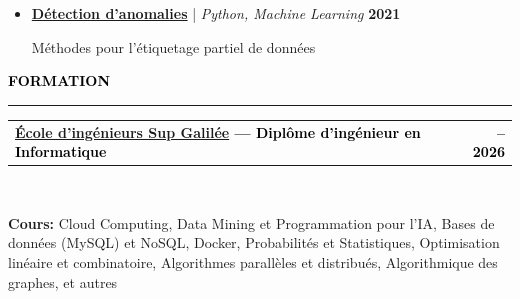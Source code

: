 \documentclass[10pt,english,french]{article}
\makeatletter
\newcommand{\educationIcon}[1][black]{\textcolor{#1}{\faGraduationCap}}
\newlength{\mpwidth}
\newcommand{\cvsection}[1]{
    \vspace{4pt}
    \textbf{\fontsize{9pt}{10pt}\selectfont \textcolor{black}{#1}}
    \vspace{6pt}
    \hrule
    \vspace{6pt}
}
\newcommand{\cvtextnotab}[1]{
    \parbox{1\mpwidth}{#1}
}
\newcommand{\cvevent}[2]{
    \vspace{2pt}
    \parbox{\mpwidth}{
        \begin{tabular*}{1\mpwidth}{@{\extracolsep{\fill}} l r}
            \textcolor{black}{\textbf{\fontsize{11}{12}\selectfont #1}} & \textcolor{black}{\textbf{\fontsize{12}{12}\selectfont #2}} \\
        \end{tabular*}\\[-8pt] %
    }
}
\newcommand{\cvsubevent}[2]{
    \parbox{\mpwidth}{
        \begin{tabular*}{1\mpwidth}{@{\extracolsep{\fill}} l r}
            \textcolor{black}{\textit{\fontsize{10}{12}\selectfont #1}} & \textcolor{black}{\textit{\fontsize{10}{12}\selectfont #2}} \\
        \end{tabular*}\\[-8pt] %
    }
    \vspace{-10pt}
}
\makeatother
\begin{document}
\begin{itemize}[leftmargin=0.5cm, label=\textbullet, itemsep=0.2em]
    \item \href{https://github.com/DmytroPalahin/Anomaly_Detection}{\textbf{Détection d'anomalies}} | \textit{Python, Machine Learning} \hfill \textbf{2021}

          Méthodes pour l'étiquetage partiel de données


\end{itemize}

\vspace{-7pt}
\cvsection{\educationIcon[black]\hspace{4pt}FORMATION}

\vspace{-3pt}
\cvevent{\href{https://www.sup-galilee.univ-paris13.fr/}{École d'ingénieurs Sup Galilée} --- Diplôme d'ingénieur en Informatique}{\fontsize{11pt}{11pt}\selectfont 2023\hspace{5pt}--\hspace{5pt}2026}

\vspace{-3pt}
\cvtextnotab{\textbf{Cours\!:} Cloud Computing, Data Mining et Programmation pour l'IA, Bases de données (MySQL) et NoSQL, Docker, Probabilités et Statistiques, Optimisation linéaire et combinatoire, Algorithmes parallèles et distribués, Algorithmique des graphes, et autres}

\vspace{-10pt}
\noindent{\textcolor{middle_light_gray}{\rule{\mpwidth}{0.2pt}}}
\vspace{-15pt}
\end{document}
